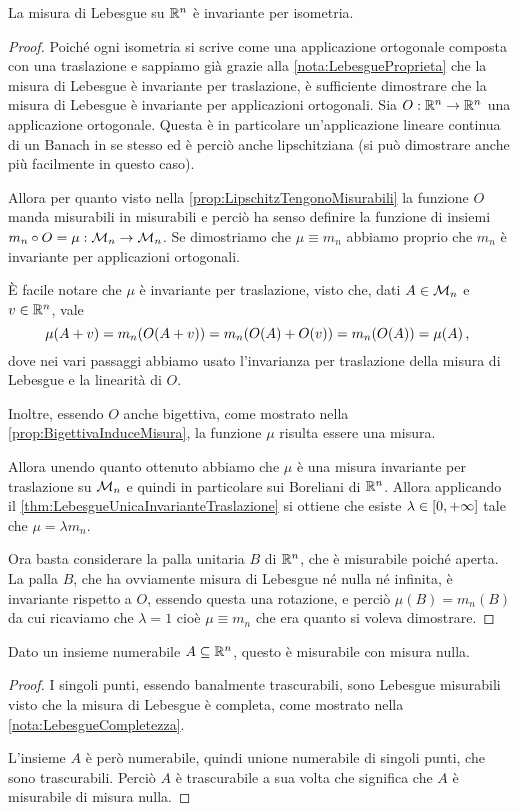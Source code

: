 \begin{proposition}\label{prop:LebesgueProprietaIsometria}
	La misura di Lebesgue su $\mathbb R^n$ è invariante per isometria.
\end{proposition}
\begin{proof}
	Poiché ogni isometria si scrive come una applicazione ortogonale composta con una traslazione e sappiamo già grazie alla \cref{nota:LebesgueProprieta} che la misura di Lebesgue è invariante per traslazione, è sufficiente dimostrare che la misura di Lebesgue è invariante per applicazioni ortogonali.
	Sia $O:\mathbb R^n\to\mathbb R^n$ una applicazione ortogonale. Questa è in particolare un'applicazione lineare continua di un Banach in se stesso ed è perciò anche lipschitziana (si può dimostrare anche più facilmente in questo caso).
	
	Allora per quanto visto nella \cref{prop:LipschitzTengonoMisurabili} la funzione $O$ manda misurabili in misurabili e perciò ha senso definire la funzione di insiemi $m_n \circ O=\mu:\mathcal M_n\to\mathcal M_n$. 
	Se dimostriamo che $\mu\equiv m_n$ abbiamo proprio che $m_n$ è invariante per applicazioni ortogonali.
	
	È facile notare che $\mu$ è invariante per traslazione, visto che, dati $A\in \mathcal M_n$ e $v\in\mathbb R^n$, vale
	\begin{equation*}
		\mu(A+v)=m_n(O(A+v))=m_n(O(A)+O(v))=m_n(O(A))=\mu(A) \, \text{, }
	\end{equation*}
	dove nei vari passaggi abbiamo usato l'invarianza per traslazione della misura di Lebesgue e la linearità di $O$.
	
	Inoltre, essendo $O$ anche bigettiva, come mostrato nella \cref{prop:BigettivaInduceMisura}, la funzione $\mu$ risulta essere una misura.
	
	Allora unendo quanto ottenuto abbiamo che $\mu$ è una misura invariante per traslazione su $\mathcal M_n$ e quindi in particolare sui Boreliani di $\mathbb R^n$. Allora applicando il \cref{thm:LebesgueUnicaInvarianteTraslazione} si ottiene che esiste $\lambda\in[0,+\infty]$ tale che $\mu=\lambda m_n$.
	
	Ora basta considerare la palla unitaria $B$ di $\mathbb R^n$, che è misurabile poiché aperta.
	La palla $B$, che ha ovviamente misura di Lebesgue né nulla né infinita, è invariante rispetto a $O$, essendo questa una rotazione, e perciò $\mu(B)=m_n(B)$ da cui ricaviamo che $\lambda=1$ cioè $\mu\equiv m_n$ che era quanto si voleva dimostrare.
\end{proof}

\begin{proposition}\label{prop:NumerabiliLebesgueTrascurabili}
	Dato un insieme numerabile $A\subseteq\mathbb R^n$, questo è misurabile con misura nulla.
\end{proposition}
\begin{proof}
	I singoli punti, essendo banalmente trascurabili, sono Lebesgue misurabili visto che la misura di Lebesgue è completa, come mostrato nella \cref{nota:LebesgueCompletezza}.
	
	L'insieme $A$ è però numerabile, quindi unione numerabile di singoli punti, che sono trascurabili. Perciò $A$ è trascurabile a sua volta che significa che $A$ è misurabile di misura nulla.
\end{proof}

